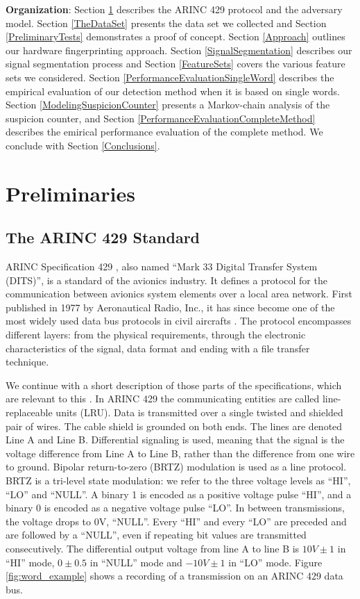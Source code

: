 \documentclass[compsoc,conference,a4paper,10pt,times]{IEEEtran}
\newcommand{\level}[1]{\section{#1}}
\newcommand{\sublevel}[1]{\subsection{#1}}
\newcommand{\level}[1]{\chapter{#1}}
\newcommand{\sublevel}[1]{\section{#1}}
\begin{document}
  
  \textbf{Organization}: Section \ref{Preliminaries} describes the ARINC 429 protocol and the adversary model. 
  Section \ref{TheDataSet} presents the data set we collected
  and Section \ref{PreliminaryTests} demonstrates a proof of concept.
  Section \ref{Approach} outlines our hardware fingerprinting approach. Section \ref{SignalSegmentation} describes our signal segmentation process and Section \ref{FeatureSets} covers the various feature sets we considered. 
  Section \ref{PerformanceEvaluationSingleWord} describes the empirical evaluation of our detection method when it is based on single words. Section \ref{ModelingSuspicionCounter} presents a Markov-chain analysis of the suspicion counter, and Section \ref{PerformanceEvaluationCompleteMethod} describes the emirical performance evaluation of the complete method. We conclude with Section \ref{Conclusions}.
  
\level{Preliminaries} \label{Preliminaries}
\sublevel{The ARINC 429 Standard}
  ARINC Specification 429 \cite{arinc2004arinc429}, also named ``Mark 33 Digital Transfer System (DITS)'', is a standard of the avionics industry. It defines a protocol for the communication between avionics system elements over a local area network. First published in 1977 by Aeronautical Radio, Inc., it has since become one of the most widely used data bus protocols in civil aircrafts \cite{MoirIan2013DBN}. The protocol encompasses different layers: from the physical requirements, through the electronic characteristics of the signal, data format and ending with a file transfer technique.

  We continue with a short description of those parts of the specifications, which are relevant to this \iftoggle{paper} {paper} {work}. In ARINC 429 the communicating entities are called line-replaceable units (LRU). Data is transmitted over a single twisted and shielded pair of wires. The cable shield is grounded on both ends. The lines are denoted Line A and Line B. Differential signaling is used, meaning that the signal is the voltage difference from Line A to Line B, rather than the difference from one wire to ground. Bipolar return-to-zero (BRTZ) modulation is used as a line protocol. BRTZ is a tri-level state modulation: we refer to the three voltage levels as ``HI'', ``LO'' and ``NULL''. A binary 1 is encoded as a positive voltage pulse ``HI'', and a binary 0 is encoded as a negative voltage pulse ``LO''. In between transmissions, the voltage drops to 0V, ``NULL''. Every ``HI'' and every ``LO'' are preceded and are followed by a ``NULL'', even if repeating bit values are transmitted consecutively. The differential output voltage from line A to line B is $10V \pm 1$ in ``HI'' mode, $0 \pm 0.5$ in ``NULL'' mode and $-10V \pm 1$ in ``LO'' mode.  Figure \ref{fig:word_example} shows a recording of a transmission on an ARINC 429 data bus.
  
\end{document}
